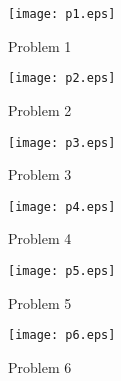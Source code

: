 
\begin{figure}[H]
	\centering
	\texttt{[image: p1.eps]}
	\caption{Problem 1}
	\label{fig:1}
\end{figure}

\begin{framed}
	
\end{framed}


\begin{figure}[H]
	\centering
	\texttt{[image: p2.eps]}
	\caption{Problem 2}
	\label{fig:2}
\end{figure}

\begin{framed}
	
\end{framed}


\begin{figure}[H]
	\centering
	\texttt{[image: p3.eps]}
	\caption{Problem 3}
	\label{fig:3}
\end{figure}

\begin{framed}
	
\end{framed}


\begin{figure}[H]
	\centering
	\texttt{[image: p4.eps]}
	\caption{Problem 4}
	\label{fig:4}
\end{figure}

\begin{framed}
	
\end{framed}


\begin{figure}[H]
	\centering
	\texttt{[image: p5.eps]}
	\caption{Problem 5}
	\label{fig:5}
\end{figure}

\begin{framed}
	
\end{framed}


\begin{figure}[H]
	\centering
	\texttt{[image: p6.eps]}
	\caption{Problem 6}
	\label{fig:6}
\end{figure}

\begin{framed}
	
\end{framed}

